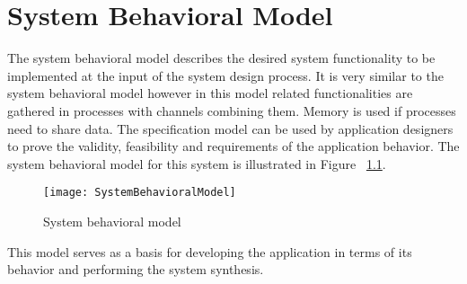 
\chapter{System Behavioral Model}
\label{cha:sysBehMod}

The system behavioral model describes the desired system functionality to be implemented at the input of the system design process. It is very similar to the system behavioral model however in this model related functionalities are gathered in processes with channels combining them. Memory is used if processes need to share data. The specification model can be used by application designers to prove the validity, feasibility and requirements of the application behavior.
The system behavioral model for this system is illustrated in Figure ~\ref{fig:SystemBehavioralModel}.

\begin{figure}[H]
\centering
\texttt{[image: SystemBehavioralModel]}
\caption{System behavioral model}
\label{fig:SystemBehavioralModel}
\end{figure}


This model serves as a basis for developing the application in terms of its behavior and performing the system synthesis.